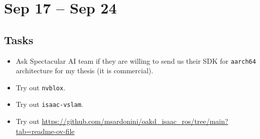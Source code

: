 \documentclass{article}
\begin{document}
\newpage

\section{Sep 17 -- Sep 24}

\subsection{Tasks}
\begin{itemize}
    \item Ask Spectacular AI team if they are willing to send us their SDK for \verb|aarch64| architecture for my thesis (it is commercial). 
    \item Try out \verb|nvblox|. 
    \item Try out \verb|isaac-vslam|. 
    \item Try out \url{https://github.com/msardonini/oakd_isaac_ros/tree/main?tab=readme-ov-file} 
\end{itemize}
\end{document}
